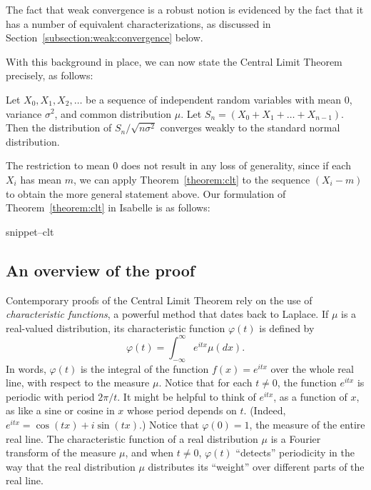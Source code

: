 \documentclass{svjour3}
\newcommand{\ph}{\varphi}
\newcommand{\Snippet}[1]{\csname snippet--#1\endcsname}
\begin{document}
The fact that weak convergence is a robust notion is evidenced by the fact that it has a number of equivalent characterizations, as discussed in Section~\ref{subsection:weak:convergence} below.

With this background in place, we can now state the Central Limit Theorem precisely, as follows:
\begin{theorem}
\label{theorem:clt}
Let $X_0, X_1, X_2, \ldots$ be a sequence of independent random variables with mean $0$, variance $\sigma^2$, and common distribution $\mu$. Let $S_n = (X_0 + X_1 + \ldots + X_{n-1})$. Then the distribution of $S_n / \sqrt{n \sigma^2}$ converges weakly to the standard normal distribution.
\end{theorem}
The restriction to mean $0$ does not result in any loss of generality, since if each $X_i$ has mean $m$, we can apply Theorem~\ref{theorem:clt} to the sequence $(X_i - m)$ to obtain the more general statement above. Our formulation of Theorem~\ref{theorem:clt} in Isabelle is as follows:

\Snippet{clt}

\subsection{An overview of the proof}
\label{subsection:overview}

Contemporary proofs of the Central Limit Theorem rely on the use of \emph{characteristic functions}, a powerful method that dates back to Laplace. If $\mu$ is a real-valued distribution, its characteristic function $\ph(t)$ is defined by
\[
\ph(t) = \int_{-\infty}^{\infty} e^{itx} \mu(dx).
\]
In words, $\ph(t)$ is the integral of the function $f(x) = e^{itx}$ over the whole real line, with respect to the measure $\mu$. Notice that for each $t \neq 0$, the function $e^{itx}$ is periodic with period $2 \pi / t$. It might be helpful to think of $e^{itx}$, as a function of $x$, as like a sine or cosine in $x$ whose period depends on $t$. (Indeed, $e^{itx}= \cos (t x) + i \sin (t x)$.) Notice that $\ph(0) = 1$, the measure of the entire real line. The characteristic function of a real distribution $\mu$ is a Fourier transform of the measure $\mu$, and when $t \neq 0$, $\ph(t)$ ``detects'' periodicity in the way that the real distribution $\mu$ distributes its ``weight'' over different parts of the real line.
\end{document}
